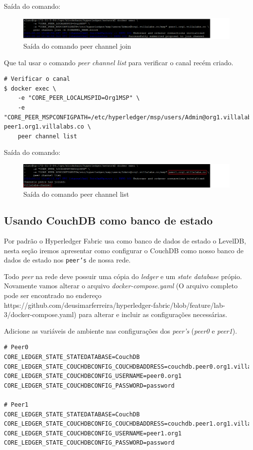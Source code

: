 \documentclass[a4paper,11pt]{article}
\begin{document}
Saída do comando:
\begin{figure}[H]
  \centering
  \includegraphics[width=1.1\textwidth]{imagens/output-org1-peer1-join.png}
  \caption{Saída do comando peer channel join}
\end{figure}

Que tal usar o comando \textit{peer channel list} para verificar o canal recém criado.
\begin{lstlisting}
# Verificar o canal
$ docker exec \
    -e "CORE_PEER_LOCALMSPID=Org1MSP" \
    -e "CORE_PEER_MSPCONFIGPATH=/etc/hyperledger/msp/users/Admin@org1.villalabs.co/msp" peer1.org1.villalabs.co \
    peer channel list
\end{lstlisting}

Saída do comando:
\begin{figure}[H]
  \centering
  \includegraphics[width=1.1\textwidth]{imagens/output-org1-peer1-list.png}
  \caption{Saída do comando peer channel list}
\end{figure}

\subsection{Usando CouchDB como banco de estado}
Por padrão o Hyperledger\cite{hyperledger} Fabric\cite{hyperledgerfabric} usa como banco de dados de estado o LevelDB, nesta seção iremos apresentar como configurar o CouchDB como nosso banco de dados de estado nos \texttt{peer's} de nossa rede.

Todo \textit{peer} na rede deve possuir uma cópia do \textit{ledger} e um \textit{state database} própio. Novamente vamos alterar o arquivo \textit{docker-compose.yaml} (O arquivo completo pode ser encontrado no endereço https://github.com/deusimarferreira/hyperledger-fabric/blob/feature/lab-3/docker-compose.yaml) para alterar e incluir as configurações necessárias.

Adicione as variáveis de ambiente nas configurações dos \textit{peer's} (\textit{peer0} e \textit{peer1}).
\begin{lstlisting}
# Peer0
CORE_LEDGER_STATE_STATEDATABASE=CouchDB
CORE_LEDGER_STATE_COUCHDBCONFIG_COUCHDBADDRESS=couchdb.peer0.org1.villalabs.co:5984
CORE_LEDGER_STATE_COUCHDBCONFIG_USERNAME=peer0.org1
CORE_LEDGER_STATE_COUCHDBCONFIG_PASSWORD=password

# Peer1
CORE_LEDGER_STATE_STATEDATABASE=CouchDB
CORE_LEDGER_STATE_COUCHDBCONFIG_COUCHDBADDRESS=couchdb.peer1.org1.villalabs.co:5984
CORE_LEDGER_STATE_COUCHDBCONFIG_USERNAME=peer1.org1
CORE_LEDGER_STATE_COUCHDBCONFIG_PASSWORD=password
\end{lstlisting}
\end{document}
